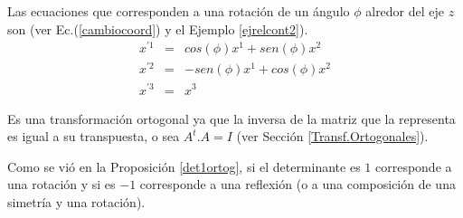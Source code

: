 \begin{example}
 Las ecuaciones que corresponden a una rotación de un ángulo $\phi$ alredor del eje $z$  son (ver Ec.(\ref{cambiocoord}) y el Ejemplo \ref{ejrelcont2}).
\begin{eqnarray}
x^{\prime 1}&=&cos(\phi) x^1+ sen(\phi) x^2 \\
x^{\prime 2}&=&-sen(\phi) x^1+ cos(\phi) x^2 \\
x^{\prime 3}&=&x^3
\end{eqnarray}

Es una transformación ortogonal ya que la inversa de la matriz que la representa es igual a su transpuesta, o sea $A^t. A=I$ (ver Sección \ref{Transf.Ortogonales}).
















Como se vió en la Proposición \ref{det1ortog}, si el determinante  es $1$ corresponde a una rotación y si es $-1$ corresponde a una reflexión (o a una composición de una simetría y una rotación).
\end{example}

